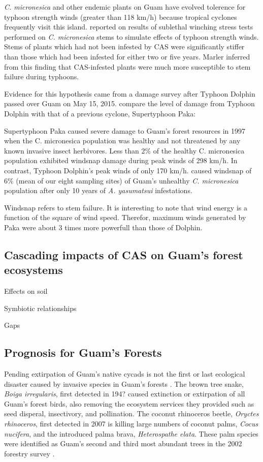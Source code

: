 \documentclass[12pt,letterpaper,english,bibliography=totocnumbered, abstract=on]{scrartcl}
\begin{document}
\textit{C. micronesica} and other endemic plants on Guam have evolved tolerence for typhoon strength winds (greater than 118 km/h) because tropical cyclones frequently visit this island.
\parencite{marlerIncreasedThreatIsland2013} reported on results of sublethal winching stress tests performed on \textit{C. micronesica} stems to simulate effects of typhoon strength winds. Stems of plants which had not been infested by CAS were significantly stiffer than those which had been infested for either two or five years. Marler inferred from this finding that CAS-infested plants were much more susceptible to stem failure during typhoons.

Evidence for this hypothesis came from a damage survey after Typhoon Dolphin passed over Guam on May 15, 2015.
\cite{marler2016topographic} compare the level of damage from Typhoon Dolphin with that of a previous cyclone, Supertyphoon Paka:
\begin{displayquote}
Supertyphoon Paka caused severe damage to
Guam’s forest resources in 1997 when the C. micronesica population was
healthy and not threatened by any known invasive insect herbivores.
Less than 2\% of the healthy C. micronesica population exhibited
windsnap damage during peak winds of 298 km/h. In contrast,
Typhoon Dolphin’s peak winds of only 170 km/h. caused windsnap
of 6\% (mean of our eight sampling sites) of Guam’s unhealthy \textit{C.
micronesica} population after only 10 years of \textit{A. yasumatsui} infestations.
\end{displayquote}
Windsnap refers to stem failure. It is interesting to note that wind energy is a function of the square of wind speed. Therefor, maximum winds generated by Paka were about 3 times more powerfull than those of Dolphin.

\subsection{Cascading impacts of CAS on Guam's forest ecosystems}

Effects on soil \cite{marlerTwoCycadSpecies2020}

Symbiotic relationships

Gaps

\subsection{Prognosis for Guam's Forests} 

Pending extirpation of Guam's native cycads is not the first or last ecological disaster caused by invasive species in Guam's forests \parencite{moore_failed_2018}. The brown tree snake, \textit{Boiga irregularis}, first detected in 194? caused extinction or extirpation of all Guam's forest birds, also removing the ecosystem services they provided such as seed disperal, insectivory, and pollination. The coconut rhinoceros beetle, \textit{Oryctes rhinoceros}, first detected in 2007 is killing large numbers of coconut palms, \textit{Cocus nucifera}, and the introduced palma brava, \textit{Heterospathe elata}. These palm species were identified as Guam's second and third most abundant trees in the 2002 forestry survey \parencite{donnegon_guams_2004}.
\end{document}
